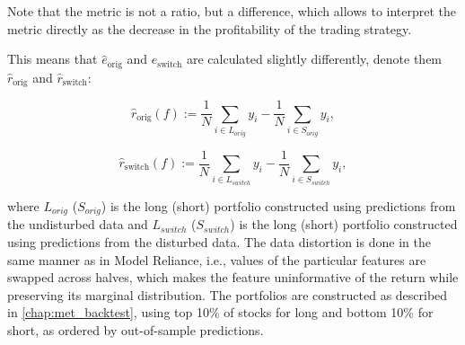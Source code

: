 			Note that the metric is not a ratio, but a difference, which allows to interpret the metric directly as the decrease in the profitability of the trading strategy.   
			
			This means that $\hat{e}_{\text{orig}}$ and $\hat{e}_{\text{switch}}$ are calculated slightly differently, denote them $\hat{r}_{\text{orig}}$ and $\hat{r}_{\text{switch}}$:
							
			\begin{equation*}
				\hat{r}_{\text{orig}}(f):= \frac{1}{N} \sum_{i \in L_{orig}} y_i - \frac{1}{N} \sum_{i \in S_{orig}} y_i, 
			\end{equation*}
		
			\begin{equation*}
				\hat{r}_{\text{switch}}(f):= \frac{1}{N} \sum_{i \in L_{switch}} y_i - \frac{1}{N} \sum_{i \in S_{switch}} y_i, 
			\end{equation*}
			
			where $L_{orig}$ ($S_{orig}$) is the long (short) portfolio constructed using predictions from the undisturbed data and $L_{switch}$ ($S_{switch}$) is the long (short) portfolio constructed using predictions from the disturbed data. The data distortion is done in the same manner as in Model Reliance, i.e., values of the particular features are swapped across halves, which makes the feature uninformative of the return while preserving its marginal distribution. The portfolios are constructed as described in \ref{chap:met_backtest}, using top 10\% of stocks for long and bottom 10\% for short, as ordered by out-of-sample predictions. 
			   
			
	 
			
			
			
		
	
		  
	
	
	
	
	
	
	
	
	
	
	
	
	
	